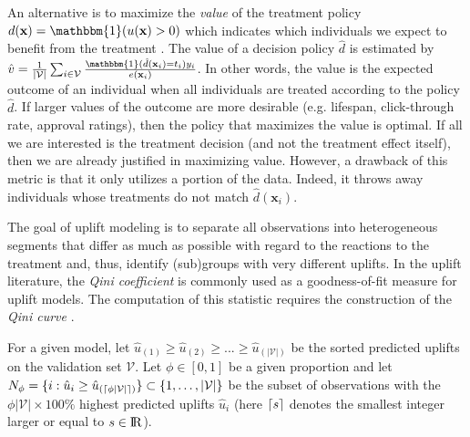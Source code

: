 \documentclass{article}
\def\x{\mathbf x}
\def \real{\rm I\!R}
\DeclarePairedDelimiter{\ceil}{\lceil}{\rceil}
\begin{document}
An alternative is to maximize the {\it value} of the treatment policy $d(\x) = \mathbbm{1}(u(\x) > 0)$ which indicates which individuals we expect to benefit from the treatment \citep{zhao2017uplift}. The value of a decision policy $\hat d$ is estimated by $\hat v =  \frac{1}{|\mathcal{V}|}\sum_{i \in \mathcal{V}} \frac{\mathbbm{1}(\hat d(\x_i) = t_i) y_i}{e(\x_i)}$. In other words, the value is the expected outcome of an individual when all individuals are treated according to the policy $\hat d$. If larger values of the outcome are more desirable (e.g. lifespan, click-through rate, approval ratings), then the policy that maximizes the value is optimal. If all we are interested is the treatment decision (and not the treatment effect itself), then we are already justified in maximizing value. However, a drawback of this metric is that it only utilizes a portion of the data. Indeed, it throws away individuals whose treatments do not match $\hat d(\x_i)$.

The goal of uplift modeling is to separate all observations into heterogeneous segments that differ as much as possible with regard to the reactions to the treatment and, thus, identify (sub)groups with very different uplifts. In the uplift literature, the {\it Qini coefficient} is commonly used as a goodness-of-fit measure for uplift models. The computation of this statistic requires the construction of the {\it Qini curve} \citep{radcliffe2007using}.

For a given model, let $\hat{u}_{(1)} \geq \hat{u}_{(2)} \geq ... \geq \hat{u}_{(|\mathcal{V}|)}$ be the sorted predicted uplifts on the validation set $\mathcal{V}$. Let $\phi \in [0,1]$ be a given proportion and let $ N_{\phi} = \{i: \hat{u}_{i} \geq \hat{u}_{(\ceil{\phi |\mathcal{V}|})} \} \subset \lbrace 1, \ldots, |\mathcal{V}| \rbrace$ be the subset of observations with the $\phi |\mathcal{V}| \times 100 \%$ highest predicted uplifts $\hat{u}_i$ (here $\ceil{s}$ denotes the smallest integer larger or equal to $s\in \real$). 
\end{document}
